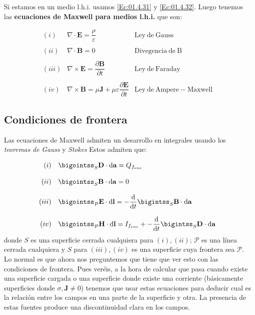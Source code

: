 \documentclass[12pt,a4paper]{article}
\newcommand{\D}{\mathrm{d}}
\newcommand{\rota}{\nabla \times}
\newcommand{\dive}{\nabla \cdot}
\newcommand{\Bn}{\mathbf{B}}
\newcommand{\En}{\mathbf{E}}
\newcommand{\Dn}{\mathbf{D}}
\newcommand{\Hn}{\mathbf{H}}
\newcommand{\Jn}{\mathbf{J}}
\newcommand{\an}{\mathbf{a}}
\newcommand{\lnn}{\mathbf{l}}
\numberwithin{equation}{section}
\numberwithin{figure}{section}
\begin{document}
Si estamos en un medio l.h.i. usamos \ref{Ec:01.4.31} y \ref{Ec:01.4.32}.   Luego tenemos las \textbf{ ecuaciones de Maxwell para medios l.h.i.} que son:

\begin{equation}
\begin{array}{rll}
(i) & \dive \En =  \dfrac{\rho}{\varepsilon} & \mathrm{Ley \ de \ Gauss} \\ \\
(ii) & \dive \Bn = 0  & \mathrm{Divegencia \ de \ B} \\ \\
(iii) & \rota \En = \dfrac{\partial \Bn}{ \partial t}  & \mathrm{Ley \ de \ Faraday} \\ \\
(iv) & \rota \Bn=  \mu \Jn +  \mu \varepsilon \dfrac{\partial \En}{\partial t} & \mathrm{Ley \ de \ Ampere-Maxwell} 
\end{array} \label{Ec:01.5.32}
\end{equation}

\subsection{Condiciones de frontera}

Las ecuaciones de Maxwell admiten un desarrollo en integrales usando los \textit{teoremas de Gauss} y \textit{Stokes} Estos admiten que:


\begin{equation}
\begin{array}{rl}
(i) & \bigointss_S \Dn \cdot \D \an =  Q_{f_{enc}}  \\ \\
(ii) & \bigointss_S \Bn \cdot \D \an = 0   \\ \\
(iii) & \bigointss_{\mathcal{P}} \En \cdot \D \lnn = -  \dfrac{\D }{ \D t}  \bigintss_S \Bn \cdot \D \an  \\ \\
(iv) & \bigointss_{\mathcal{P}} \Hn \cdot \D \lnn =  I_{f_{enc}} +   -  \dfrac{\D }{ \D t}  \bigintss_S \Dn \cdot \D \an 
\end{array} \label{Ec:01.4.18}
\end{equation}
donde $S$ es una superficie cerrada cualquiera para $(i),(ii)$; $\mathcal{P}$ es una línea cerrada cualquiera y $S$ para $(iii),(iv)$ es una superficie cuya frontera sea $\mathcal{P}$. \\

Lo normal es que ahora nos preguntemos que tiene que ver esto con las condiciones de frontera. Pues veréis, a la hora de calcular que pasa cuando existe una superficie cargada o una superficie donde existe una corriente (básicamente superficies donde $\sigma,\Jn \neq 0$) tenemos que usar estas ecuaciones para deducir cual es la relación entre los campos en una parte de la superficie y otra. La presencia de estas fuentes produce una discontinuidad clara en los campos. \\
\end{document}
